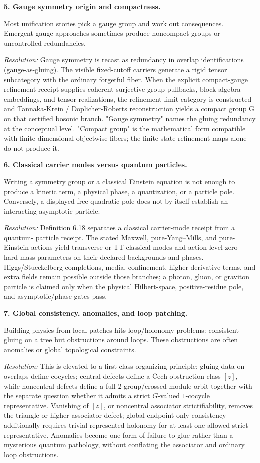 \textbf{5. Gauge symmetry origin and compactness.}

Most unification stories pick a gauge group and work out consequences. Emergent-gauge approaches sometimes produce noncompact groups or uncontrolled redundancies.

\emph{Resolution:} Gauge symmetry is recast as redundancy in overlap identifications (gauge-as-gluing). The visible fixed-cutoff carriers generate a rigid tensor subcategory with the ordinary forgetful fiber. When the explicit compact-gauge refinement receipt supplies coherent surjective group pullbacks, block-algebra embeddings, and tensor realizations, the refinement-limit category is constructed and Tannaka-Krein / Doplicher-Roberts reconstruction yields a compact group G on that certified bosonic branch. "Gauge symmetry" names the gluing redundancy at the conceptual level. "Compact group" is the mathematical form compatible with finite-dimensional objectwise fibers; the finite-state refinement maps alone do not produce it.

\textbf{6. Classical carrier modes versus quantum particles.}

Writing a symmetry group or a classical Einstein equation is not enough to produce a kinetic term,
a physical phase, a quantization, or a particle pole. Conversely, a displayed free quadratic pole
does not by itself establish an interacting asymptotic particle.

\emph{Resolution:} Definition 6.18 separates a classical carrier-mode receipt from a quantum-
particle receipt. The stated Maxwell, pure-Yang--Mills, and pure-Einstein actions yield transverse
or TT classical modes and action-level zero hard-mass parameters on their declared backgrounds and
phases. Higgs/Stueckelberg completions, media, confinement, higher-derivative terms, and extra fields
remain possible outside those branches; a photon, gluon, or graviton particle is claimed only when
the physical Hilbert-space, positive-residue pole, and asymptotic/phase gates pass.

\textbf{7. Global consistency, anomalies, and loop patching.}

Building physics from local patches hits loop/holonomy problems: consistent gluing on a tree but obstructions around loops. These obstructions are often anomalies or global topological constraints.

\emph{Resolution:} This is elevated to a first-class organizing principle: gluing data on overlaps define cocycles; central defects define a \v{C}ech obstruction class \([z]\), while noncentral defects define a full 2-group/crossed-module orbit together with the separate question whether it admits a strict \(G\)-valued \(1\)-cocycle representative. Vanishing of \([z]\), or noncentral associator strictifiability, removes the triangle or higher associator defect; global endpoint-only consistency additionally requires trivial represented holonomy for at least one allowed strict representative. Anomalies become one form of failure to glue rather than a mysterious quantum pathology, without conflating the associator and ordinary loop obstructions.

